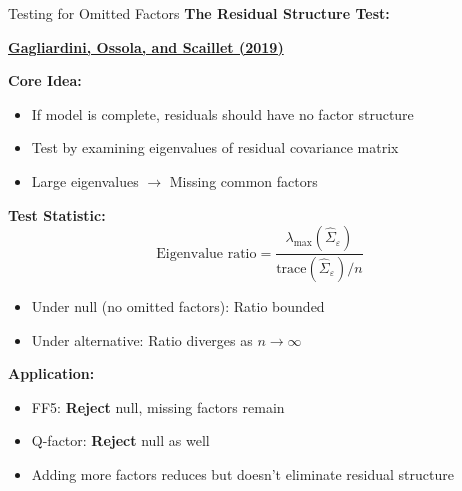 \documentclass{beamer}
\begin{document}
\begin{frame}{Testing for Omitted Factors}
    \textbf{The Residual Structure Test:}
    
    \textbf{\textcolor{blue}{\href{https://doi.org/10.1016/j.jeconom.2019.06.001}{Gagliardini, Ossola, and Scaillet (2019)}}}
    
    
    \textbf{Core Idea:}
    \begin{itemize}
        \item If model is complete, residuals should have no factor structure
        \item Test by examining eigenvalues of residual covariance matrix
        \item Large eigenvalues $\rightarrow$ Missing common factors
    \end{itemize}
    
    
    \textbf{Test Statistic:}
    \begin{equation*}
        \text{Eigenvalue ratio} = \frac{\lambda_{\max}(\hat{\Sigma}_\varepsilon)}{\text{trace}(\hat{\Sigma}_\varepsilon)/n}
    \end{equation*}
    
    \begin{itemize}
        \item Under null (no omitted factors): Ratio bounded
        \item Under alternative: Ratio diverges as $n \to \infty$
    \end{itemize}
    
    
    \textbf{Application:}
    \begin{itemize}
        \item FF5: \textbf{Reject} null, missing factors remain
        \item Q-factor: \textbf{Reject} null as well
        \item Adding more factors reduces but doesn't eliminate residual structure
    \end{itemize}
\end{frame}
\end{document}
